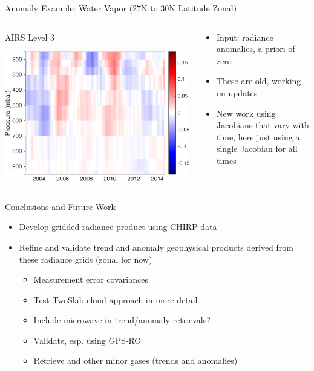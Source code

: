 \documentclass[10pt,t]{beamer}
\begin{document}
\begin{frame}[label={sec:org0133b30}]{Anomaly Example: Water Vapor (27N to 30N Latitude Zonal)}
\vspace{-0.15in}
\begin{columns}
\begin{column}{0.55\columnwidth}
\begin{block}{\footnotesize AIRS Level 3}
\vspace{-0.1in}
\begin{center}
\includegraphics[width=0.8\linewidth]{./oFigs/water_lati_30_L3.png}
\end{center}
\end{block}
\end{column}

\begin{column}{0.55\columnwidth}
\begin{block}{\footnotesize}
\small
\begin{itemize}
\item Input: radiance anomalies, a-priori of zero
\item These are old, working on updates
\item New work using Jacobians that vary with time, here just using a single Jacobian for all times
\end{itemize}
\end{block}
\end{column}
\end{columns}
\end{frame}

\begin{frame}[label={sec:orga4b2b8a}]{Conclusions and Future Work}
\begin{itemize}
\item Develop gridded radiance product using CHIRP data
\item Refine and validate trend and anomaly geophysical products derived from these radiance grids (zonal for now)
\begin{itemize}
\item Measurement error covariances
\item Test TwoSlab cloud approach in more detail
\item Include microwave in trend/anomaly retrievals?
\item Validate, esp. using GPS-RO
\item Retrieve \cd and other minor gases (trends and anomalies)
\end{itemize}
\end{itemize}
\end{frame}
\end{document}

